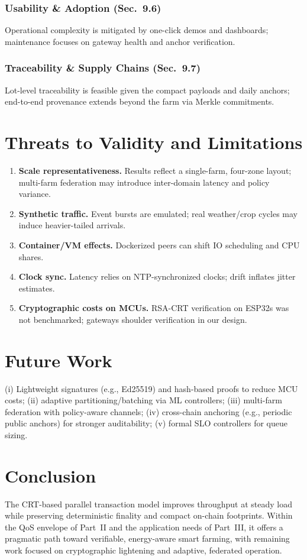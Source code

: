 \subsubsection{Usability \& Adoption (Sec.~9.6)}
Operational complexity is mitigated by one-click demos and dashboards; maintenance focuses on gateway health and anchor verification.

\subsubsection{Traceability \& Supply Chains (Sec.~9.7)}
Lot-level traceability is feasible given the compact payloads and daily anchors; end-to-end provenance extends beyond the farm via Merkle commitments.

\section{Threats to Validity and Limitations}
\begin{enumerate}
  \item \textbf{Scale representativeness.} Results reflect a single-farm, four-zone layout; multi-farm federation may introduce inter-domain latency and policy variance.
  \item \textbf{Synthetic traffic.} Event bursts are emulated; real weather/crop cycles may induce heavier-tailed arrivals.
  \item \textbf{Container/VM effects.} Dockerized peers can shift IO scheduling and CPU shares.
  \item \textbf{Clock sync.} Latency relies on NTP-synchronized clocks; drift inflates jitter estimates.
  \item \textbf{Cryptographic costs on MCUs.} RSA-CRT verification on ESP32s was not benchmarked; gateways shoulder verification in our design.
\end{enumerate}

\section{Future Work}
(i) Lightweight signatures (e.g., Ed25519) and hash-based proofs to reduce MCU costs; (ii) adaptive partitioning/batching via ML controllers; (iii) multi-farm federation with policy-aware channels; (iv) cross-chain anchoring (e.g., periodic public anchors) for stronger auditability; (v) formal SLO controllers for queue sizing.

\section{Conclusion}
The CRT-based parallel transaction model improves throughput at steady load while preserving deterministic finality and compact on-chain footprints. Within the QoS envelope of Part~II and the application needs of Part~III, it offers a pragmatic path toward verifiable, energy-aware smart farming, with remaining work focused on cryptographic lightening and adaptive, federated operation.

